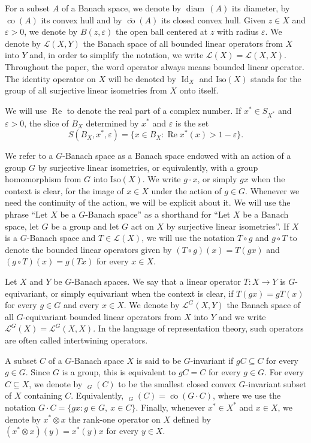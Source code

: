 \documentclass[a4paper,12pt]{amsart}
\theoremstyle{definition}
\theoremstyle{definition}
\theoremstyle{remark}
\numberwithin{equation}{section}
\newcommand{\clco}{\mathop{\overline{\mathrm{co}}}\nolimits}
\newcommand{\Iso}{\mathrm{Iso}}
\DeclareMathOperator{\diam}{diam\,}
\DeclareMathOperator{\co}{co}
\DeclareMathOperator{\re}{Re}
\DeclareMathOperator{\id}{Id}
\newcommand{\<}{\langle}
\renewcommand{\>}{\rangle}
\newcommand{\e}{\varepsilon}
\begin{document}
	For a subset $A$ of a Banach space, we denote by $\diam(A)$ its diameter, by $\co(A)$ its convex hull and by $\overline{\co}(A)$ its closed convex hull. Given $z\in X$ and $\e>0$, we denote by $B(z,\e)$ the open ball centered at $z$ with radius $\e$. We denote by $\mathcal L(X,Y)$ the Banach space of all bounded linear operators from $X$ into $Y$ and, in order to simplify the notation, we write $\mathcal L(X)=\mathcal L(X,X)$. Throughout the paper, the word operator always means bounded linear operator. The identity operator on $X$ will be denoted by $\id_X$ and $\Iso(X)$ stands for the group of all surjective linear isometries from $X$ onto itself.
	
	We will use $\re$ to denote the real part of a complex number. If $x^*\in S_{X^*}$ and $\e>0$, the slice of $B_X$ determined by $x^*$ and $\e$ is the set
	\begin{equation*} 
		S(B_X,x^*,\e) = \{x\in B_X:\re x^*(x)>1-\e\}.
	\end{equation*} 
	
	
	We refer to a $G$-Banach space as a Banach space endowed with an action of a group $G$ by surjective linear isometries, or equivalently, with a group homomorphism from $G$ into $\Iso(X)$. We write $g\cdot x$, or simply $gx$ when the context is clear, for the image of $x\in X$ under the action of $g\in G$. Whenever we need the continuity of the action, we will be explicit about it. We will use the phrase ``Let $X$ be a $G$-Banach space'' as a shorthand for ``Let $X$ be a Banach space, let $G$ be a group and let $G$ act on $X$ by surjective linear isometries''. If $X$ is a $G$-Banach space and $T\in\mathcal L(X)$, we will use the notation $T\circ g$ and $g\circ T$ to denote the bounded linear operators given by $(T\circ g)(x)=T(gx)$ and $(g\circ T)(x)=g(Tx)$ for every $x\in X$.
	
	Let $X$ and $Y$ be $G$-Banach spaces. We say that a linear operator $T:X\to Y$ is $G$-equivariant, or simply equivariant when the context is clear, if $T(gx)=gT(x)$ for every $g\in G$ and every $x\in X$. We denote by $\mathcal L^G(X,Y)$ the Banach space of all $G$-equivariant bounded linear operators from $X$ into $Y$ and we write $\mathcal L^G(X)=\mathcal L^G(X,X)$. In the language of representation theory, such operators are often called intertwining operators.
	
	A subset $C$ of a $G$-Banach space $X$ is said to be $G$-invariant if $gC\subseteq C$ for every $g\in G$. Since $G$ is a group, this is equivalent to $gC=C$ for every $g\in G$. For every $C\subseteq X$, we denote by $\clco_G(C)$ to be the smallest closed convex $G$-invariant subset of $X$ containing $C$. Equivalently, $\clco_G(C)=\overline{\co}(G\cdot C)$, where we use the notation $G\cdot C=\{gx:g\in G,\ x\in C\}$. Finally, whenever $x^*\in X^*$ and $x\in X$, we denote by $x^*\otimes x$ the rank-one operator on $X$ defined by $(x^*\otimes x)(y)=x^*(y)x$ for every $y\in X$.
	
\end{document}
